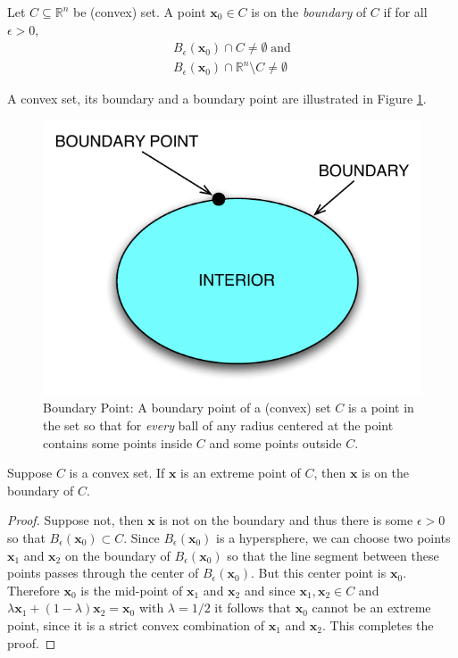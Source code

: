 \begin{definition} Let $C \subseteq \mathbb{R}^n$ be (convex) set. A point $\mathbf{x}_0 \in C$ is on the \textit{boundary} of $C$ if for all $\epsilon > 0$, 
\begin{gather*}
B_\epsilon(\mathbf{x}_0) \cap C \neq \emptyset \;\text{and}\\
B_\epsilon(\mathbf{x}_0) \cap \mathbb{R}^n \setminus C \neq \emptyset
\end{gather*}
\end{definition}
\begin{example} A convex set, its boundary and a boundary point are illustrated in Figure \ref{fig:BoundaryPoint}.
\begin{figure}[htbp]
\includegraphics[scale=0.5]{Boundary.pdf}
\caption{Boundary Point: A boundary point of a (convex) set $C$ is a point in the set so that for \textit{every} ball of any radius centered at the point contains some points inside $C$ and some points outside $C$.}
\label{fig:BoundaryPoint}
\end{figure}
\end{example}

\begin{lemma} Suppose $C$ is a convex set. If $\mathbf{x}$ is an extreme point of $C$, then $\mathbf{x}$ is on the boundary of $C$. 
\label{lem:BoundaryExtremePoint}
\end{lemma}
\begin{proof} Suppose not, then $\mathbf{x}$ is not on the boundary and thus there is some $\epsilon > 0$ so that $B_\epsilon(\mathbf{x}_0) \subset C$. Since $B_\epsilon(\mathbf{x}_0)$ is a hypersphere, we can choose two points $\mathbf{x}_1$ and $\mathbf{x}_2$ on the boundary of $B_\epsilon(\mathbf{x}_0)$ so that the line segment between these points passes through the center of $B_\epsilon(\mathbf{x}_0)$. But this center point is $\mathbf{x}_0$. Therefore $\mathbf{x}_0$ is the mid-point of $\mathbf{x}_1$ and $\mathbf{x}_2$ and since $\mathbf{x}_1,\mathbf{x}_2 \in C$ and $\lambda\mathbf{x}_1 + (1-\lambda)\mathbf{x}_2 = \mathbf{x}_0$ with $\lambda = 1/2$ it follows that $\mathbf{x}_0$ cannot be an extreme point, since it is a strict convex combination of $\mathbf{x}_1$ and $\mathbf{x}_2$. This completes the proof.
\end{proof}


